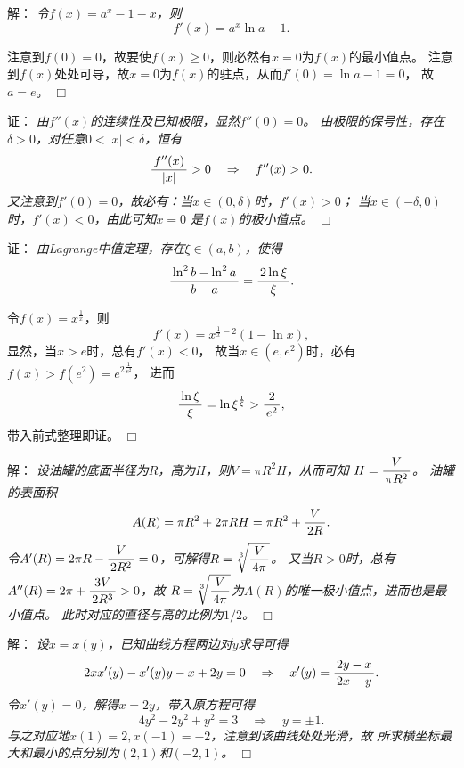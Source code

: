 \begin{frame}
	\linespread{1.5}
	
	\pause
	\small 解：\it 
	令$f(x)=a^x-1-x$，则
	$$f'(x)=a^x\ln a-1.$$
	
	\pause
	注意到$f(0)=0$，故要使$f(x)\geq0$，则必然有$x=0$为$f(x)$的最小值点。
	注意到$f(x)$处处可导，故$x=0$为$f(x)$的驻点，从而$f'(0)=\ln a-1=0$，
	故$a=e$。
	\hfill$\Box$
\end{frame}

\begin{frame}
	\linespread{1.5}
	
	\pause
	\small 证：\it 
	由$f''(x)$的连续性及已知极限，显然$f''(0)=0$。
	由极限的保号性，存在$\delta>0$，对任意$0<|x|<\delta$，恒有
	$$\displaystyle\frac{\,{f''(x)}\,}{\,{|x|}\,}>0\quad
	\Rightarrow\quad f''(x)>0.$$
	又注意到$f'(0)=0$，故必有：当$x\in(0,\delta)$时，$f'(x)>0$；
	当$x\in(-\delta,0)$时，$f'(x)<0$，由此可知$x=0$
	是$f(x)$的极小值点。
	\hfill$\Box$
\end{frame}

\begin{frame}
	\linespread{1.5}
	
	\pause
	\small 证：\it 
	由Lagrange中值定理，存在$\xi\in(a,b)$，使得
	$$\displaystyle\frac{\,{\ln^2b-\ln^2a}\,}{\,{b-a}\,}=\displaystyle\frac{\,{2\ln\xi}\,}{\,{\xi}\,}.$$
	
	令$f(x)=x^{\frac1x}$，则
	$$f'(x)=x^{\frac1x-2}(1-\ln x),$$
	显然，当$x>e$时，总有$f'(x)<0$，
	故当$x\in(e,e^2)$时，必有$f(x)>f(e^2)={e^2}^{\frac1{e^2}}$，
	进而
	$$\displaystyle\frac{\,{\ln\xi}\,}{\,{\xi}\,}=\ln\xi^{\frac1{\xi}}>\displaystyle\frac{\,{2}\,}{\,{e^2}\,},$$
	带入前式整理即证。
	\hfill$\Box$
\end{frame}

\begin{frame}
	\linespread{1.5}
	
	\pause
	\small 解：\it 
	设油罐的底面半径为$R$，高为$H$，则$V=\pi R^2H$，从而可知
	$H=\displaystyle\frac{\,{V}\,}{\,{\pi R^2}\,}$。	
	油罐的表面积
	$$A(R)=\pi R^2+2\pi RH=\pi R^2+\displaystyle\frac{\,{V}\,}{\,{2R}\,}.$$
	令$A'(R)=2\pi R-\displaystyle\frac{\,{V}\,}{\,{2R^2}\,}=0$，可解得$R=\sqrt[3]{\displaystyle\frac{\,{V}\,}{\,{4\pi}\,}}$。
	又当$R>0$时，总有$A''(R)=2\pi+\displaystyle\frac{\,{3V}\,}{\,{2R^3}\,}>0$，故
	$R=\sqrt[3]{\displaystyle\frac{\,{V}\,}{\,{4\pi}\,}}$为$A(R)$的唯一极小值点，进而也是最小值点。
	此时对应的直径与高的比例为$1/2$。
	\hfill$\Box$
\end{frame}

\begin{frame}
	\linespread{1.5}
	
	\pause
	\small 解：\it 
	设$x=x(y)$，已知曲线方程两边对$y$求导可得
	$$2xx'(y)-x'(y)y-x+2y=0
	\quad\Rightarrow\quad
	x'(y)=\displaystyle\frac{\,{2y-x}\,}{\,{2x-y}\,}.$$
	令$x'(y)=0$，解得$x=2y$，带入原方程可得
	$$4y^2-2y^2+y^2=3
	\quad\Rightarrow\quad
	y=\pm1.$$
	与之对应地$x(1)=2,x(-1)=-2$，注意到该曲线处处光滑，故
	所求横坐标最大和最小的点分别为$(2,1)$和$(-2,1)$。
	\hfill$\Box$
\end{frame}


